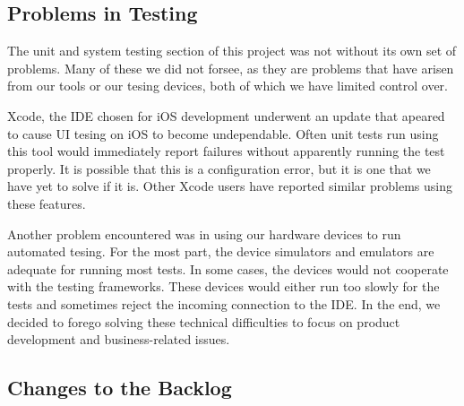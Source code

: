 \subsection{Problems in Testing}

The unit and system testing section of this project was not without its own set
of problems. Many of these we did not forsee, as they are problems that have
arisen from our tools or our tesing devices, both of which we have limited
control over.

Xcode, the IDE chosen for iOS development underwent an update that apeared to
cause UI tesing on iOS to become undependable. Often unit tests run using this
tool would immediately report failures without apparently running the test
properly. It is possible that this is a configuration error, but it is one that
we have yet to solve if it is. Other Xcode users have reported similar problems
using these features.

Another problem encountered was in using our hardware devices to run automated
tesing. For the most part, the device simulators and emulators are adequate for
running most tests. In some cases, the devices would not cooperate with the
testing frameworks. These devices would either run too slowly for the tests and
sometimes reject the incoming connection to the IDE. In the end, we decided to
forego solving these technical difficulties to focus on product development and
business-related issues.


\subsection{Changes to the Backlog}

